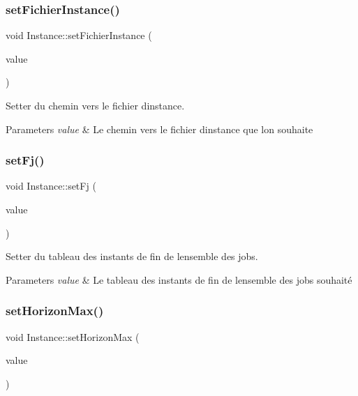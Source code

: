\subsubsection{\texorpdfstring{set\+Fichier\+Instance()}{setFichierInstance()}}
{\footnotesize\ttfamily void Instance\+::set\+Fichier\+Instance (\begin{DoxyParamCaption}\item[{const Q\+String \&}]{value }\end{DoxyParamCaption})}



Setter du chemin vers le fichier d\textquotesingle{}instance. 


\begin{DoxyParams}{Parameters}
{\em value} & Le chemin vers le fichier d\textquotesingle{}instance que l\textquotesingle{}on souhaite \\
\hline
\end{DoxyParams}
\mbox{\label{classInstance_a544764ab0dcb42e795c5bfee4a0681cf}} 
\subsubsection{\texorpdfstring{set\+Fj()}{setFj()}}
{\footnotesize\ttfamily void Instance\+::set\+Fj (\begin{DoxyParamCaption}\item[{const vector$<$ unsigned int $>$ \&}]{value }\end{DoxyParamCaption})}



Setter du tableau des instants de fin de l\textquotesingle{}ensemble des jobs. 


\begin{DoxyParams}{Parameters}
{\em value} & Le tableau des instants de fin de l\textquotesingle{}ensemble des jobs souhaité \\
\hline
\end{DoxyParams}
\mbox{\label{classInstance_aca68cfedc71eb3b2e7051ef99412e965}} 
\subsubsection{\texorpdfstring{set\+Horizon\+Max()}{setHorizonMax()}}
{\footnotesize\ttfamily void Instance\+::set\+Horizon\+Max (\begin{DoxyParamCaption}\item[{unsigned int}]{value }\end{DoxyParamCaption})}



